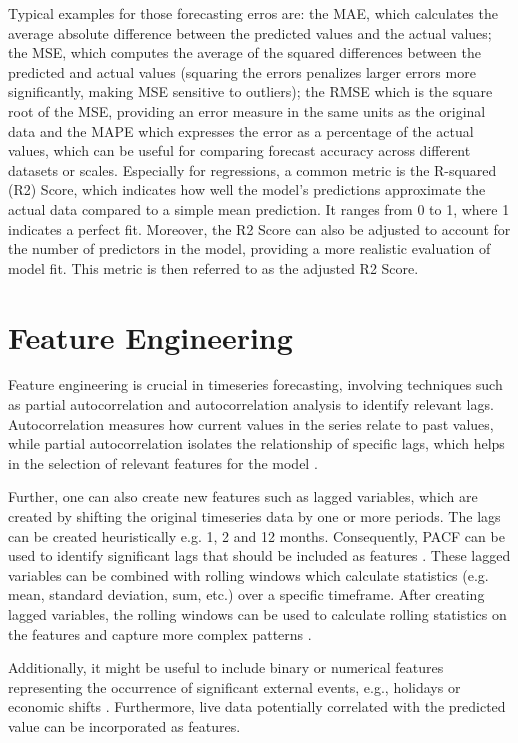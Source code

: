 Typical examples for those forecasting erros are: the \ac{MAE}, which calculates the average absolute difference between the predicted values and the actual values; the \ac{MSE}, which computes the average of the squared differences between the predicted and actual values (squaring the errors penalizes larger errors more significantly, making MSE sensitive to outliers); the \ac{RMSE} which is the square root of the \ac{MSE}, providing an error measure in the same units as the original data and the \ac{MAPE} which expresses the error as a percentage of the actual values, which can be useful for comparing forecast accuracy across different datasets or scales. Especially for regressions, a common metric is the R-squared (R2) Score, which indicates how well the model's predictions approximate the actual data compared to a simple mean prediction. It ranges from 0 to 1, where 1 indicates a perfect fit. Moreover, the R2 Score can also be adjusted to account for the number of predictors in the model, providing a more realistic evaluation of model fit. This metric is then referred to as the adjusted R2 Score.

\section{Feature Engineering}
Feature engineering is crucial in timeseries forecasting, involving techniques such as partial autocorrelation and autocorrelation analysis to identify relevant lags. Autocorrelation measures how current values in the series relate to past values, while partial autocorrelation isolates the relationship of specific lags, which helps in the selection of relevant features for the model \parencite{box2015time}.

Further, one can also create new features such as lagged variables, which are created by shifting the original timeseries data by one or more periods. The lags can be created heuristically e.g. 1, 2 and 12 months. Consequently, \ac{PACF} can be used to identify significant lags that should be included as features \parencite[ch. 6]{hyndman2018forecasting}. These lagged variables can be combined with rolling windows which calculate statistics (e.g. mean, standard deviation, sum, etc.) over a specific timeframe. After creating lagged variables, the rolling windows can be used to calculate rolling statistics on the features and capture more complex patterns \parencite[ch. 6]{hyndman2018forecasting}.

Additionally, it might be useful to include binary or numerical features representing the occurrence of significant external events, e.g., holidays or economic shifts \parencite[ch. 3]{hyndman2018forecasting}. Furthermore, live data potentially correlated with the predicted value can be incorporated as features.


